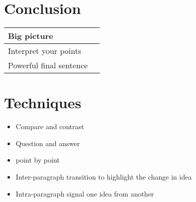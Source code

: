 \documentclass[10pt,a4paper]{article}
\begin{document}
\section{Conclusion}
\begin{center}
	\begin{tabular}{|l|l|}
		\hline
		Big picture &\\
		\hline
		Interpret your points &\\
		\hline
		Powerful final sentence&\\
		\hline 
	\end{tabular}
\end{center}
\section{Techniques}
\begin{itemize}
	\item Compare and contrast
	\item Question and answer
	\item point by point
	\item Inter-paragraph transition to highlight the change in idea
	\item Intra-paragraph signal one idea from another
\end{itemize}


\end{document}
